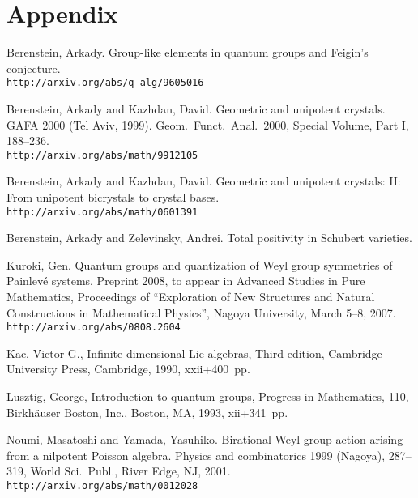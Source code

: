 \documentclass[12pt,a4paper]{article}
\theoremstyle{plain} %
\theoremstyle{definition} %
\theoremstyle{definition} %
\numberwithin{theorem}{section}
\numberwithin{equation}{section}
\numberwithin{figure}{section}
\numberwithin{table}{section}
\begin{document}

\section{Appendix}


\begin{thebibliography}{99}

Berenstein, Arkady.
Group-like elements in quantum groups and Feigin's conjecture.
\\ {\tt http://arxiv.org/abs/q-alg/9605016}

Berenstein, Arkady and Kazhdan, David. 
Geometric and unipotent crystals. 
GAFA 2000 (Tel Aviv, 1999).  
Geom.\ Funct.\ Anal.\  2000,  Special Volume, Part I, 188--236.
\\ {\tt http://arxiv.org/abs/math/9912105}

Berenstein, Arkady and Kazhdan, David. 
Geometric and unipotent crystals:
II: From unipotent bicrystals to crystal bases.
\\ {\tt http://arxiv.org/abs/math/0601391}

Berenstein, Arkady and Zelevinsky, Andrei. 
Total positivity in Schubert varieties.

Kuroki, Gen.
Quantum groups and quantization of 
Weyl group symmetries of Painlev\'e systems.
Preprint 2008,
to appear in Advanced Studies in Pure Mathematics, 
Proceedings of ``Exploration of New Structures and Natural Constructions in Mathematical Physics'', 
Nagoya University, March 5--8, 2007.
\\ {\tt http://arxiv.org/abs/0808.2604}

Kac, Victor G., 
Infinite-dimensional Lie algebras, 
Third edition, 
Cambridge University Press, Cambridge, 1990, xxii+400~pp.

Lusztig, George,
Introduction to quantum groups,
Progress in Mathematics, 110, 
Birkh\"auser Boston, Inc., Boston, MA, 1993, xii+341~pp.

Noumi, Masatoshi and Yamada, Yasuhiko.
Birational Weyl group action arising from a nilpotent Poisson algebra.  
Physics and combinatorics 1999 (Nagoya),  287--319, World Sci.\ Publ., River Edge, NJ, 2001.
\\ {\tt http://arxiv.org/abs/math/0012028}

\end{thebibliography}

\end{document}
